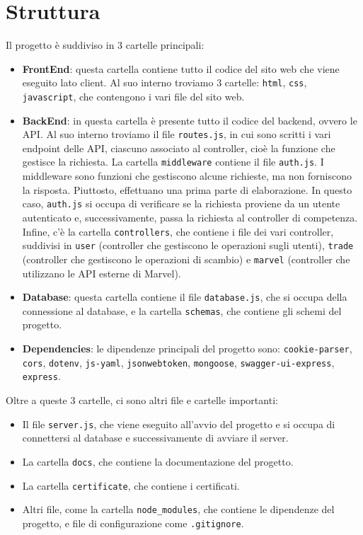 \documentclass{article}
\begin{document}
\section{Struttura}
    Il progetto è suddiviso in 3 cartelle principali:
    \begin{itemize}
        \item \textbf{FrontEnd}: questa cartella contiene tutto il codice del sito web che viene eseguito lato client. Al suo interno troviamo 3 cartelle: \texttt{html}, \texttt{css}, \texttt{javascript}, che contengono i vari file del sito web.
        \item \textbf{BackEnd}: in questa cartella è presente tutto il codice del backend, ovvero le API. Al suo interno troviamo il file \texttt{routes.js}, in cui sono scritti i vari endpoint delle API, ciascuno associato al controller, cioè la funzione che gestisce la richiesta. La cartella \texttt{middleware} contiene il file \texttt{auth.js}. I middleware sono funzioni che gestiscono alcune richieste, ma non forniscono la risposta. Piuttosto, effettuano una prima parte di elaborazione. In questo caso, \texttt{auth.js} si occupa di verificare se la richiesta proviene da un utente autenticato e, successivamente, passa la richiesta al controller di competenza. Infine, c'è la cartella \texttt{controllers}, che contiene i file dei vari controller, suddivisi in \texttt{user} (controller che gestiscono le operazioni sugli utenti), \texttt{trade} (controller che gestiscono le operazioni di scambio) e \texttt{marvel} (controller che utilizzano le API esterne di Marvel).
        \item \textbf{Database}: questa cartella contiene il file \texttt{database.js}, che si occupa della connessione al database, e la cartella \texttt{schemas}, che contiene gli schemi del progetto.
        \item \textbf{Dependencies}: le dipendenze principali del progetto sono: \texttt{cookie-parser}, \texttt{cors}, \texttt{dotenv}, \texttt{js-yaml}, \texttt{jsonwebtoken}, \texttt{mongoose}, \texttt{swagger-ui-express}, \texttt{express}.
    \end{itemize}
    
    Oltre a queste 3 cartelle, ci sono altri file e cartelle importanti:
    \begin{itemize}
        \item Il file \texttt{server.js}, che viene eseguito all'avvio del progetto e si occupa di connettersi al database e successivamente di avviare il server.
        \item La cartella \texttt{docs}, che contiene la documentazione del progetto.
        \item La cartella \texttt{certificate}, che contiene i certificati.
        \item Altri file, come la cartella \texttt{node\_modules}, che contiene le dipendenze del progetto, e file di configurazione come \texttt{.gitignore}.
    \end{itemize}
\end{document}
